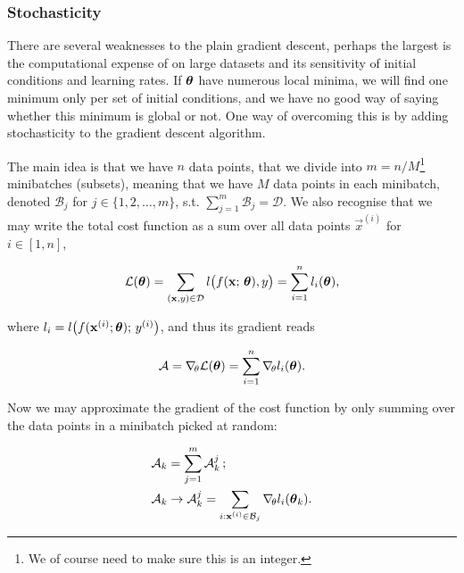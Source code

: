        


        

    \subsubsection{Stochasticity}\label{sec:stochasticity}
        There are several weaknesses to the plain gradient descent, perhaps the largest is the computational expense of on large datasets and its sensitivity of initial conditions and learning rates. If $\boldsymbol{\theta}$ have numerous local minima, we will find one minimum only per set of initial conditions, and we have no good way of saying whether this minimum is global or not. One way of overcoming this is by adding stochasticity to the gradient descent algorithm. 

        The main idea is that we have $n$ data points, that we divide into $m=n/M$\footnote{We of course need to make sure this is an integer. } minibatches (subsets), meaning that we have $M$ data points in each minibatch, denoted $\mathcal{B}_j$ for $j\in\{1,2,\dots,m\}$, s.t. $\sum\nolimits_{j=1}^m \mathcal{B}_j = \mathcal{D}$. We also recognise that we may write the total cost function as a sum over all data points $\vec{x}^{(i)}$ for $i\in[1,n]$, 

        \begin{equation}
            \mathcal{L}(\boldsymbol{\theta}) =\sum_{(\mathbf{x}, y)\in \mathcal{D}} l\big(f(\mathbf{x};\,\boldsymbol{\theta}), y \big) = \sum_{i=1}^n l_i(\boldsymbol{\theta}),
        \end{equation}

        where $l_i = l\big(f(\mathbf{x}^{(i)};\boldsymbol{\theta}); \, y^{(i)}\big)$, and thus its gradient reads
    
        \begin{equation}
            \mathcal{A} = \nabla_{\!\theta} \mathcal{L}(\boldsymbol{\theta}) = \sum_{i=1}^n \nabla_{\!\theta}l_i(\boldsymbol{\theta}).
        \end{equation}
        
        Now we may approximate the gradient of the cost function by only summing over the data points in a minibatch picked at random:
        
        \begin{equation}\label{eq:sgd_gradient}
            \begin{split}
            \mathcal{A}_k &= \sum_{j=1}^{m}\mathcal{A}_k^j\, ; \\
            \mathcal{A}_k &\to \mathcal{A}^j_k = \sum_{i:\mathbf{x}^{(i)} \in\mathcal{B}_j }\nabla_{\!\theta} l_i(\boldsymbol{\theta}_k).
            \end{split}
        \end{equation}

